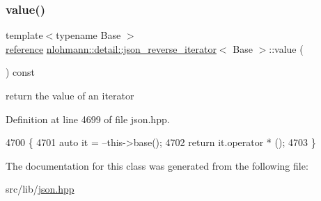 \subsubsection{\texorpdfstring{value()}{value()}}
{\footnotesize\ttfamily template$<$typename Base $>$ \\
\hyperlink{classnlohmann_1_1detail_1_1json__reverse__iterator_a42f51a69bac7b2aebb613b2164e457f1}{reference} \hyperlink{classnlohmann_1_1detail_1_1json__reverse__iterator}{nlohmann\+::detail\+::json\+\_\+reverse\+\_\+iterator}$<$ Base $>$\+::value (\begin{DoxyParamCaption}{ }\end{DoxyParamCaption}) const\hspace{0.3cm}{\ttfamily [inline]}}



return the value of an iterator 



Definition at line 4699 of file json.\+hpp.


\begin{DoxyCode}
4700     \{
4701         \textcolor{keyword}{auto} it = --this->base();
4702         \textcolor{keywordflow}{return} it.operator * ();
4703     \}
\end{DoxyCode}


The documentation for this class was generated from the following file\+:\begin{DoxyCompactItemize}
\item 
src/lib/\hyperlink{json_8hpp}{json.\+hpp}\end{DoxyCompactItemize}
